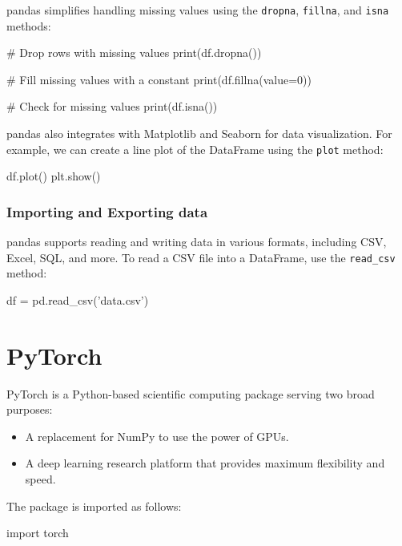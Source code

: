 pandas simplifies handling missing values using the \texttt{dropna}, \texttt{fillna}, and \texttt{isna} methods:

\begin{codeblock}[language=python]
    # Drop rows with missing values
    print(df.dropna())

    # Fill missing values with a constant
    print(df.fillna(value=0))

    # Check for missing values
    print(df.isna())
\end{codeblock}

pandas also integrates with Matplotlib and Seaborn for data visualization. For example, we can
create a line plot of the DataFrame using the \texttt{plot} method:

\begin{codeblock}[language=python]
    df.plot()
    plt.show()
\end{codeblock}

\subsubsection*{Importing and Exporting data}

pandas supports reading and writing data in various formats, including CSV, Excel, SQL, and more.
To read a CSV file into a DataFrame, use the \texttt{read\_csv} method:

\begin{codeblock}[language=python]
    df = pd.read_csv('data.csv')
\end{codeblock}


\section{PyTorch}

PyTorch is a Python-based scientific computing package serving two broad purposes:
\begin{itemize}
    \item A replacement for NumPy to use the power of GPUs.
    \item A deep learning research platform that provides maximum flexibility and speed.
\end{itemize}

The package is imported as follows:

\begin{codeblock}[language=python]
    import torch
\end{codeblock}

